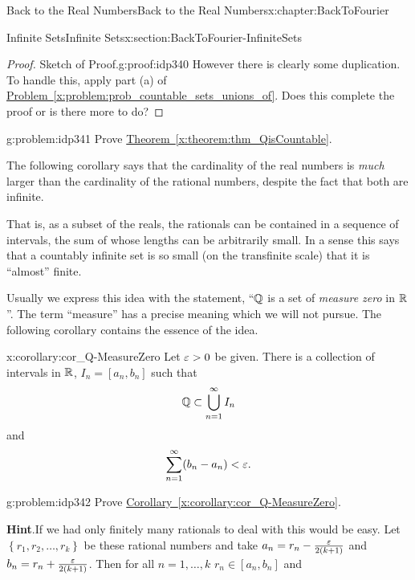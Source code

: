 \begin{chapterptx}{Back to the Real Numbers}{}{Back to the Real Numbers}{}{}{x:chapter:BackToFourier}
\begin{sectionptx}{Infinite Sets}{}{Infinite Sets}{}{}{x:section:BackToFourier-InfiniteSets}
\begin{proof}{Sketch of Proof.}{g:proof:idp340}
			However there is clearly some duplication. To handle this, apply part (a) of \hyperref[x:problem:prob_countable_sets_unions_of]{Problem~{\xreffont\ref{x:problem:prob_countable_sets_unions_of}}}. Does this complete the proof or is there more to do?%
		\end{proof}
		\begin{problem}{}{g:problem:idp341}%
			 Prove \hyperref[x:theorem:thm_QisCountable]{Theorem~{\xreffont\ref{x:theorem:thm_QisCountable}}}.%
		\end{problem}
		The following corollary says that the cardinality of the real numbers is \emph{much} larger than the cardinality of the rational numbers, despite the fact that both are infinite.%
		\par
		That is, as a subset of the reals, the rationals can be contained in a sequence of intervals, the sum of whose lengths can be arbitrarily small. In a sense this says that a countably infinite set is so small (on the transfinite scale) that it is ``almost'' finite.%
		\par
		 Usually we express this idea with the statement, ``\(\mathbb {Q}\) is a set of \emph{measure zero} in \(\mathbb {R}\)''. The term ``measure'' has a precise meaning which we will not pursue. The following corollary contains the essence of the idea.%
		\begin{corollary}{}{}{x:corollary:cor_Q-MeasureZero}%
			Let \(\varepsilon>0\) be given. There is a collection of intervals in \(\mathbb {R}\), \(I_n=[a_n,b_n]\) such that%
			\begin{equation*}
				\mathbb {Q} \subset \bigcup_{n=1}^\infty I_n
			\end{equation*}
			and%
			\begin{equation*}
				\sum_{n=1}^\infty(b_n-a_n)< \varepsilon\text{.}
			\end{equation*}
		\end{corollary}
		\begin{problem}{}{g:problem:idp342}%
			 Prove \hyperref[x:corollary:cor_Q-MeasureZero]{Corollary~{\xreffont\ref{x:corollary:cor_Q-MeasureZero}}}.%
			\par\smallskip%
			\noindent\textbf{\blocktitlefont Hint}.\hypertarget{g:hint:idp343}{}\quad{}If we had only finitely many rationals to deal with this would be easy. Let \(\left\{r_1, r_2, \ldots,
			r_k\right\}\) be these rational numbers and take \(a_n=r_n-\frac{\varepsilon}{2(k+1)}\) and \(b_n=r_n+\frac{\varepsilon}{2(k+1)}\). Then for all \(n=1,\ldots, k\) \(r_n\in[a_n,b_n]\) and%

\end{problem}
\end{sectionptx}
\end{chapterptx}
